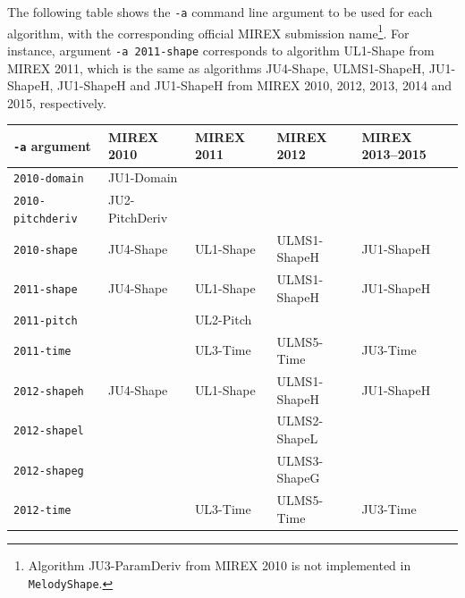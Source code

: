 \documentclass[twoside]{article}
\begin{document}
The following table shows the \texttt{-a} command line argument to be used for each algorithm, with the corresponding official MIREX submission name\footnote{Algorithm \textsf{JU3-ParamDeriv} from MIREX 2010 is not implemented in \texttt{MelodyShape}.}. For instance, argument \texttt{-a 2011-shape} corresponds to algorithm \textsf{UL1-Shape} from MIREX 2011, which is the same as algorithms \textsf{JU4-Shape}, \textsf{ULMS1-ShapeH}, \textsf{JU1-ShapeH}, \textsf{JU1-ShapeH} and \textsf{JU1-ShapeH} from MIREX 2010, 2012, 2013, 2014 and 2015, respectively.

\begin{table}[!h]\setlength{\tabcolsep}{4pt}
\small\centering\begin{tabular}{l|llll}
	\hline
	\texttt{-a} argument     & MIREX 2010              & MIREX 2011         & MIREX 2012               & MIREX 2013--2015             \\ \hline
	\texttt{2010-domain}     & \textsf{JU1-Domain}     &                    &                          &                        \\
	\texttt{2010-pitchderiv} & \textsf{JU2-PitchDeriv} &                    &                          &                        \\
	\texttt{2010-shape}      & \textsf{JU4-Shape}      & \textsf{UL1-Shape} & \textsf{ULMS1-ShapeH}    & \textsf{JU1-ShapeH}    \\ \hline
	\texttt{2011-shape}      & \textsf{JU4-Shape}      & \textsf{UL1-Shape} & \textsf{ULMS1-ShapeH}    & \textsf{JU1-ShapeH}    \\
	\texttt{2011-pitch}      &                         & \textsf{UL2-Pitch} &                          &                        \\
	\texttt{2011-time}       &                         & \textsf{UL3-Time}  & \textsf{ULMS5-Time}      & \textsf{JU3-Time}      \\ \hline
	\texttt{2012-shapeh}     & \textsf{JU4-Shape}      & \textsf{UL1-Shape} & \textsf{ULMS1-ShapeH}    & \textsf{JU1-ShapeH}    \\
	\texttt{2012-shapel}     &                         &                    & \textsf{ULMS2-ShapeL}    &                        \\
	\texttt{2012-shapeg}     &                         &                    & \textsf{ULMS3-ShapeG}    &                        \\
	\texttt{2012-time}       &                         & \textsf{UL3-Time}  & \textsf{ULMS5-Time}      & \textsf{JU3-Time}      \\

\end{tabular}
\end{table}
\end{document}
